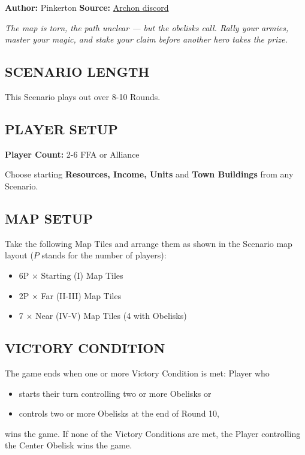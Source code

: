 
\begin{multicols*}{2}

\textbf{Author:} Pinkerton
\textbf{Source:} \href{<https://discord.com/channels/740870068178649108/1232319328049954826>}{Archon discord}

\textit{The map is torn, the path unclear — but the obelisks call. Rally your armies, master your magic, and stake your claim before another hero takes the prize.}

\subsection*{\MakeUppercase{Scenario Length}}
This Scenario plays out over 8-10 Rounds.

\subsection*{\MakeUppercase{Player Setup}}
\textbf{Player Count:} 2-6 FFA or Alliance

Choose starting \textbf{Resources, Income, Units} and \textbf{Town Buildings} from any Scenario.

\subsection*{\MakeUppercase{Map Setup}}
Take the following Map Tiles and arrange them as shown in the Scenario map layout ($P$ stands for the number of players):

\begin{itemize}
  \item 6P × Starting (I) Map Tiles
  \item 2P × Far (II-III) Map Tiles
  \item 7 × Near (IV-V) Map Tiles (4 with Obelisks)
\end{itemize}

\subsection*{\MakeUppercase{Victory Condition}}
The game ends when one or more Victory Condition is met: Player who
\begin{itemize}
  \item starts their turn controlling two or more Obelisks or
  \item controls two or more Obelisks at the end of Round 10,
\end{itemize}
wins the game. If none of the Victory Conditions are met, the Player controlling the Center Obelisk wins the game.


\end{multicols*}
